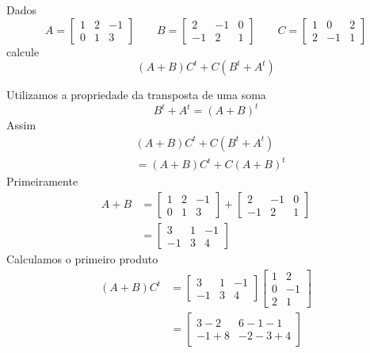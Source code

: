 \documentclass[a4paper,12pt,fleqn]{article}
\begin{document}

Dados
\[
A=
\begin{bmatrix}
  1 &  2 & -1\\
  0 &  1 &  3
\end{bmatrix}
\qquad
B=
\begin{bmatrix}
  2 & -1 &  0\\
 -1 &  2 &  1
\end{bmatrix}
\qquad
C=
\begin{bmatrix}
  1 &  0 &  2\\
  2 & -1 &  1
\end{bmatrix}
\]
calcule
\[
(A+B)C^t+C(B^t+A^t)
\]

\begin{answer}
Utilizamos a propriedade da transposta de uma soma
\[
B^t+A^t=(A+B)^t
\]
Assim
\begin{align*}
&(A+B)C^t+C(B^t+A^t)
\\
&=(A+B)C^t+C(A+B)^t
\end{align*}
Primeiramente
\begin{align*}
A+B
&=
\begin{bmatrix}
  1 &  2 & -1\\
  0 &  1 &  3
\end{bmatrix}
+
\begin{bmatrix}
  2 & -1 &  0\\
 -1 &  2 &  1
\end{bmatrix}
\\[2mm]
&=
\begin{bmatrix}
  3 & 1 & -1\\
 -1 & 3 &  4
\end{bmatrix}
\end{align*}
Calculamos o primeiro produto
\begin{align*}
(A+B)C^t
&=
\begin{bmatrix}
  3 & 1 & -1\\
 -1 & 3 &  4
\end{bmatrix}
\begin{bmatrix}
  1 & 2\\
  0 & -1\\
  2 & 1
\end{bmatrix}
\\[2mm]
&=
\begin{bmatrix}
  3-2 & 6-1-1\\
 -1+8 & -2-3+4
\end{bmatrix}

\end{align*}
\end{answer}
\end{document}
